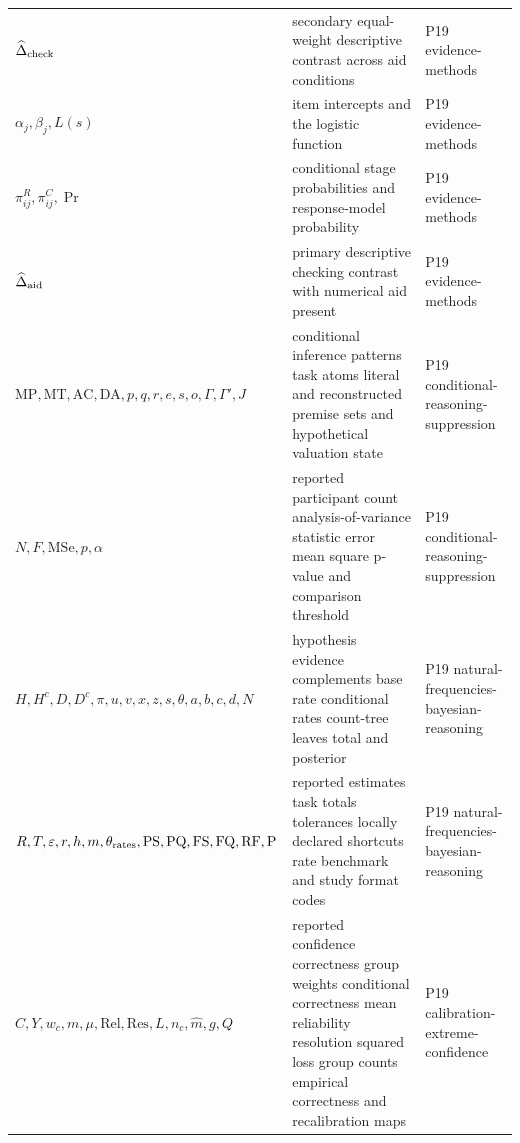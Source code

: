\begin{longtable}{@{}p{}p{}p{}@{}}
\(\widehat\Delta_{\rm check}\) & secondary equal-weight descriptive contrast across aid conditions & P19 evidence-\allowbreak{}methods \\
\(\alpha_j,\allowbreak \beta_j,\allowbreak L(s)\) & item intercepts and the logistic function & P19 evidence-\allowbreak{}methods \\
\(\pi^R_{ij},\allowbreak \pi^C_{ij},\allowbreak \Pr\) & conditional stage probabilities and response-model probability & P19 evidence-\allowbreak{}methods \\
\(\widehat\Delta_{\rm aid}\) & primary descriptive checking contrast with numerical aid present & P19 evidence-\allowbreak{}methods \\
\(\mathrm{MP},\allowbreak \mathrm{MT},\allowbreak \mathrm{AC},\allowbreak \mathrm{DA},\allowbreak p,\allowbreak q,\allowbreak r,\allowbreak e,\allowbreak s,\allowbreak o,\allowbreak \Gamma,\allowbreak \Gamma',\allowbreak J\) & conditional inference patterns task atoms literal and reconstructed premise sets and hypothetical valuation state & P19 conditional-\allowbreak{}reasoning-\allowbreak{}suppression \\
\(N,\allowbreak F,\allowbreak \mathrm{MSe},\allowbreak p,\allowbreak \alpha\) & reported participant count analysis-of-variance statistic error mean square p-value and comparison threshold & P19 conditional-\allowbreak{}reasoning-\allowbreak{}suppression \\
\(H,\allowbreak H^c,\allowbreak D,\allowbreak D^c,\allowbreak \pi,\allowbreak u,\allowbreak v,\allowbreak x,\allowbreak z,\allowbreak s,\allowbreak \theta,\allowbreak a,\allowbreak b,\allowbreak c,\allowbreak d,\allowbreak N\) & hypothesis evidence complements base rate conditional rates count-tree leaves total and posterior & P19 natural-\allowbreak{}frequencies-\allowbreak{}bayesian-\allowbreak{}reasoning \\
\(R,\allowbreak T,\allowbreak \varepsilon,\allowbreak r,\allowbreak h,\allowbreak m,\allowbreak \theta_{\rm rates},\allowbreak \mathrm{PS},\allowbreak \mathrm{PQ},\allowbreak \mathrm{FS},\allowbreak \mathrm{FQ},\allowbreak \mathrm{RF},\allowbreak \mathrm P\) & reported estimates task totals tolerances locally declared shortcuts rate benchmark and study format codes & P19 natural-\allowbreak{}frequencies-\allowbreak{}bayesian-\allowbreak{}reasoning \\
\(C,\allowbreak Y,\allowbreak w_c,\allowbreak m,\allowbreak \mu,\allowbreak \mathrm{Rel},\allowbreak \mathrm{Res},\allowbreak L,\allowbreak n_c,\allowbreak \widehat m,\allowbreak g,\allowbreak Q\) & reported confidence correctness group weights conditional correctness mean reliability resolution squared loss group counts empirical correctness and recalibration maps & P19 calibration-\allowbreak{}extreme-\allowbreak{}confidence \\

\end{longtable}
